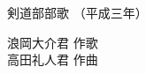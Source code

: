 \documentclass[10pt,b5j]{tarticle} %
\begin{document}
\begin{minipage}[c]{0.7\hsize} %
    \begin{center}
        {\LARGE
            剣道部部歌 %
        }
        {\small 
            （平成三年） %
        }
    \end{center}
\end{minipage}
\begin{minipage}[c]{0.3\hsize} %
    \begin{flushright} %
        浪岡大介君 作歌\\高田礼人君 作曲 %
    \end{flushright}
\end{minipage}
\end{document}
